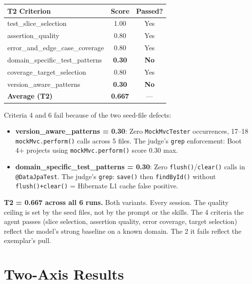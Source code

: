 \documentclass[11pt,a4paper]{article}
\begin{document}
\begin{center}
\renewcommand{\arraystretch}{1.3}
\begin{tabular}{@{}lcc@{}}
\toprule
\textbf{T2 Criterion} & \textbf{Score} & \textbf{Passed?} \\
\midrule
test\_slice\_selection          & 1.00 & Yes \\
assertion\_quality              & 0.80 & Yes \\
error\_and\_edge\_case\_coverage & 0.80 & Yes \\
domain\_specific\_test\_patterns & \textbf{0.30} & \textbf{No} \\
coverage\_target\_selection      & 0.80 & Yes \\
version\_aware\_patterns         & \textbf{0.30} & \textbf{No} \\
\midrule
\textbf{Average (T2)}          & \textbf{0.667} & --- \\
\bottomrule
\end{tabular}
\end{center}

Criteria 4 and 6 fail because of the two seed-file defects:
\begin{itemize}
  \item \textbf{version\_aware\_patterns = 0.30}: Zero \texttt{MockMvcTester} occurrences,
    17--18 \texttt{mockMvc.perform()} calls across 5 files. The judge's \texttt{grep}
    enforcement: Boot 4+ projects using \texttt{mockMvc.perform()} score 0.30 max.
  \item \textbf{domain\_specific\_test\_patterns = 0.30}: Zero \texttt{flush()}/\texttt{clear()}
    calls in \texttt{@DataJpaTest}. The judge's \texttt{grep}: \texttt{save()} then
    \texttt{findById()} without \texttt{flush()+clear()} = Hibernate L1 cache false positive.
\end{itemize}

\begin{warningbox}
\textbf{T2 = 0.667 across all 6 runs.} Both variants. Every session.
The quality ceiling is set by the seed files, not by the prompt or the skills.
The 4 criteria the agent passes (slice selection, assertion quality, error coverage,
target selection) reflect the model's strong baseline on a known domain.
The 2 it fails reflect the exemplar's pull.
\end{warningbox}

\section{Two-Axis Results}
\label{sec:results}
\end{document}
